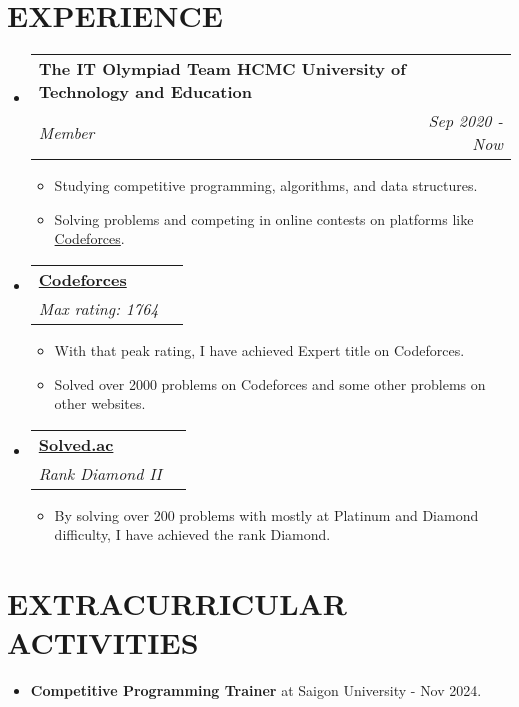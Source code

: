 \documentclass[letterpaper,11pt]{article}
\makeatletter
\newcommand{\resumeItem}[1]{
  \item\small{
    {#1 \vspace{-1pt}}
  }
}
\newcommand{\resumeSubheading}[4]{
  \vspace{-2pt}\item
    \begin{tabular*}{1.0\textwidth}[t]{l@{\extracolsep{\fill}}r}
      \textbf{\large#1} & \textbf{\small #2} \\
      \textit{\large#3} & \textit{\small #4} \\
      
    \end{tabular*}\vspace{-7pt}
}
\newcommand{\resumeSubHeadingListStart}{\begin{itemize}[leftmargin=0.0in, label={}]}
\newcommand{\resumeSubHeadingListEnd}{\end{itemize}}
\newcommand{\resumeItemListStart}{\begin{itemize}[leftmargin=0.1in]}
\newcommand{\resumeItemListEnd}{\end{itemize}\vspace{-5pt}}
\makeatother
\begin{document}
    
      
\vspace{-8pt}

\section{\color{airforceblue}EXPERIENCE}
  \resumeSubHeadingListStart

    \resumeSubheading
      {The IT Olympiad Team HCMC University of Technology and Education}{} 
      {Member}{Sep 2020 - Now}
      \resumeItemListStart
            \resumeItem{\normalsize{Studying competitive programming, algorithms, and data structures.}}
            \resumeItem{\normalsize{Solving problems and competing in online contests on platforms like \href{https://codeforces.com/}{\color{blue}Codeforces}.}}
      \resumeItemListEnd  

    \resumeSubheading
      {\href{https://codeforces.com/profile/FortuneWillWinICPC/}{\color{blue}Codeforces}}{} 
      {Max rating: 1764}{}
      \resumeItemListStart
            \resumeItem{\normalsize{With that peak rating, I have achieved Expert title on Codeforces.}}
            \resumeItem{\normalsize{Solved over 2000 problems on Codeforces and some other problems on other websites.}}  
      \resumeItemListEnd  

    \resumeSubheading
      {\href{https://solved.ac/en/profile/hvmegy}{\color{blue}Solved.ac}}{} 
      {Rank Diamond II}{}
      \resumeItemListStart
            \resumeItem{\normalsize{By solving over 200 problems with mostly at Platinum and Diamond difficulty, I have achieved the rank Diamond.}}
           
      \resumeItemListEnd  

  \resumeSubHeadingListEnd
\vspace{-12pt}


\section{\color{airforceblue}EXTRACURRICULAR ACTIVITIES}
      \resumeItemListStart
        \resumeItem{\normalsize{\textbf{Competitive Programming Trainer} at Saigon University - {Nov 2024}.}} 
        \vspace{-5pt}
      \resumeItemListEnd 
      
\vspace{-12pt}
\end{document}
